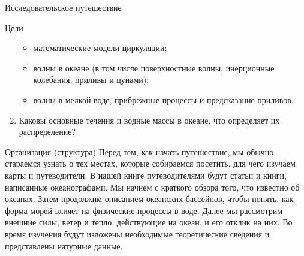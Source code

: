 \begin{chapter}{Исследовательское путешествие}
\begin{section}{Цели}
\begin{enumerate}
\begin{itemize}
  \item
  математические модели циркуляции; 
%
  \item
  волны в океане (в том числе поверхностные волны, инерционные колебания, 
  приливы и цунами); 
%

  \item
  волны в мелкой воде, прибрежные процессы и предсказание приливов.
%
\end{itemize}

\item
Каковы основные течения и водные массы в океане, что определяет их 
распределение?
%
\end{enumerate}
\end{section}

\begin{section}{Организация (структура)}
Перед тем, как начать путешествие, мы обычно стараемся узнать о тех местах, 
которые собираемся посетить, для чего изучаем карты и путеводители. 
В нашей книге путеводителями будут статьи и книги, написанные океанографами. 
Мы начнем с краткого обзора того, что известно об океанах. 
Затем продолжим описанием океанских бассейнов, чтобы понять, как форма 
морей влияет на физические процессы в воде. Далее мы рассмотрим внешние силы, 
ветер и тепло, действующие на океан, и его отклик на них. Во время изучения 
будут изложены необходимые теоретические сведения и представлены натурные 
данные.
%



\end{section}
\end{chapter}
